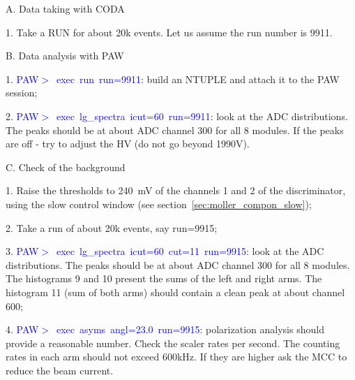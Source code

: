 {\begin{list}{}{\setlength{\itemsep}{0.5cm}}
  \item[A.] Data taking with CODA
        \begin{list}{}{\setlength{\itemsep}{0.cm}}
             \item[1.] Take a RUN for about 20k events. Let us assume the run 
                       number is 9911.
        \end{list}
  \item[B.] Data analysis with PAW
        \begin{list}{--}{\setlength{\itemsep}{0.cm}}
             \item[1.]  \textcolor{blue}{PAW$>$~exec~run~run=9911}: build an NTUPLE and 
                       attach it to the PAW session;
             \item[2.]  \textcolor{blue}{PAW$>$~exec~lg\_spectra~icut=60~run=9911}: look at the 
                       ADC distributions. The peaks should be at about ADC channel 300
                       for all 8 modules. If the peaks are off - try to adjust
                       the HV (do not go beyond 1990V).
        \end{list}
  \item[C.] Check of the background
        \begin{list}{}{\setlength{\itemsep}{0.cm}}
             \item[1.] Raise the thresholds to 240~mV of the channels 1 and 2
                       of the discriminator, using the slow control window 
                       (see section~\ref{sec:moller_compon_slow});
             \item[2.] Take a run of about 20k events, say run=9915;
             \item[3.]  \textcolor{blue}{PAW$>$~exec~lg\_spectra~icut=60~cut=11~run=9915}: look at the 
                       ADC distributions. The peaks should be at about ADC channel 300
                       for all 8 modules. The histograms 9 and 10 present the sums
                       of the left and right arms.
                       The histogram 11 (sum of both arms) should contain a clean peak at
                       about channel 600;
             \item[4.] \textcolor{blue}{PAW$>$~exec~asyms~angl=23.0~run=9915}: polarization analysis should
                       provide a reasonable number. Check the scaler rates per second.
                       The counting rates in each arm should not exceed 600kHz. If they
                       are higher ask the MCC to reduce the beam current.
        \end{list}
\end{list}

}
